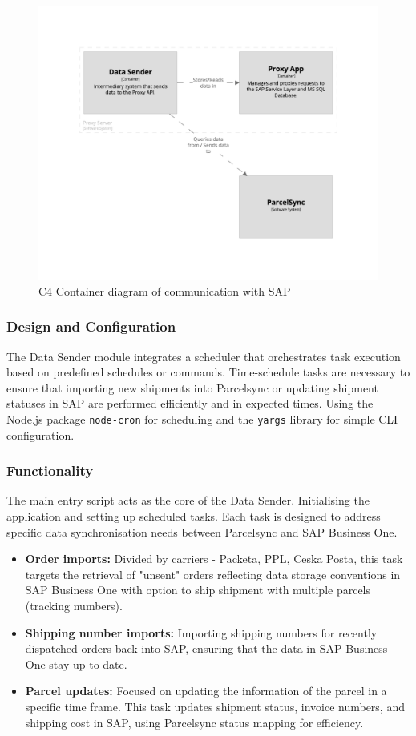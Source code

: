 \begin{figure}[p]\centering
\includegraphics[width=140mm]{img/chap07/fig_data_sender.png}
\caption{C4 Container diagram of communication with SAP}
\label{img07:structurizr:data_sender}
\end{figure}


\subsubsection{Design and Configuration}
The Data Sender module integrates a scheduler that orchestrates task execution based on predefined schedules or commands.
Time-schedule tasks are necessary to ensure that importing new shipments into Parcelsync or updating shipment statuses in SAP are performed efficiently and in expected times.
Using the Node.js package \texttt{node-cron} for scheduling and the \texttt{yargs} library for simple CLI configuration.

\subsubsection{Functionality}
The main entry script acts as the core of the Data Sender.
Initialising the application and setting up scheduled tasks.
Each task is designed to address specific data synchronisation needs between Parcelsync and SAP Business One.
\begin{itemize}
    \item \textbf{Order imports:} Divided by carriers - Packeta, PPL, Ceska Posta, this task targets the retrieval of "unsent" orders reflecting data storage conventions in SAP Business One with option to ship shipment with multiple parcels (tracking numbers).
    \item \textbf{Shipping number imports:} Importing shipping numbers for recently dispatched orders back into SAP, ensuring that the data in SAP Business One stay up to date.
    \item \textbf{Parcel updates:} Focused on updating the information of the parcel in a specific time frame. This task updates shipment status, invoice numbers, and shipping cost in SAP, using Parcelsync status mapping for efficiency.
\end{itemize}

